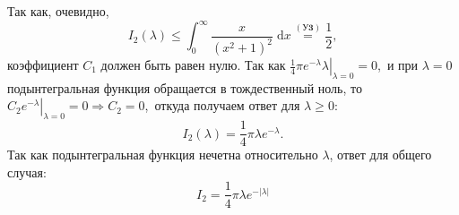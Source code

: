 Так как, очевидно,
\begin{equation*}
  I_2(\lambda) \le \int_{0}^{\infty} \frac{x}{ \left(x^2 + 1 \right)^2}\; \mathrm{d} x \overset{(\textbf{У3})}{=} \frac{1}{2},
\end{equation*}
коэффициент $C_1$ должен быть равен нулю. Так как $\left.\frac{1}{4}\pi e^{-\lambda}\lambda\right|_{\lambda = 0} = 0$,\
и при $\lambda = 0$ подынтегральная функция обращается в тождественный ноль, то $\left.C_2e^{-\lambda}\right|_{\lambda=0} = 0 \Rightarrow C_2 = 0$,\
откуда получаем ответ для $\lambda \ge 0$:
\begin{equation*}
I_2(\lambda) = \frac{1}{4}\pi \lambda e^{-\lambda}.
\end{equation*}
Так как подынтегральная функция нечетна относительно $\lambda$, ответ для общего случая:
\begin{equation*}
\boxed{I_2 = \frac{1}{4}\pi \lambda e^{-|\lambda|}}
\end{equation*}


